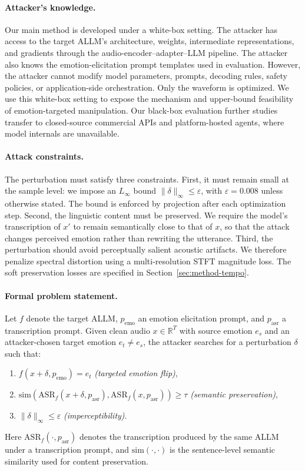 \paragraph{Attacker's knowledge.}
Our main method is developed under a white-box setting. The attacker has access to the target ALLM's architecture, weights, intermediate representations, and gradients through the audio-encoder--adapter--LLM pipeline. The attacker also knows the emotion-elicitation prompt templates used in evaluation. However, the attacker cannot modify model parameters, prompts, decoding rules, safety policies, or application-side orchestration. Only the waveform is optimized. We use this white-box setting to expose the mechanism and upper-bound feasibility of emotion-targeted manipulation. Our black-box evaluation further studies transfer to closed-source commercial APIs and platform-hosted agents, where model internals are unavailable.

\paragraph{Attack constraints.}
The perturbation must satisfy three constraints. First, it must remain small at the sample level: we impose an $L_\infty$ bound $\|\delta\|_\infty\leq \varepsilon$, with $\varepsilon=0.008$ unless otherwise stated. The bound is enforced by projection after each optimization step. Second, the linguistic content must be preserved. We require the model's transcription of $x'$ to remain semantically close to that of $x$, so that the attack changes perceived emotion rather than rewriting the utterance. Third, the perturbation should avoid perceptually salient acoustic artifacts. We therefore penalize spectral distortion using a multi-resolution STFT magnitude loss. The soft preservation losses are specified in Section~\ref{sec:method-tempo}.

\paragraph{Formal problem statement.}
Let $f$ denote the target ALLM, $p_{\mathrm{emo}}$ an emotion elicitation prompt, and $p_{\mathrm{asr}}$ a transcription prompt. Given clean audio $x\in\mathbb{R}^{T}$ with source emotion $e_s$ and an attacker-chosen target emotion $e_t\neq e_s$, the attacker searches for a perturbation $\delta$ such that:
\begin{enumerate}
    \item[\textnormal{(i)}] $f(x+\delta, p_{\mathrm{emo}})=e_t$ \hfill \textit{(targeted emotion flip)},
    \item[\textnormal{(ii)}] $\mathrm{sim}\!\left(\mathrm{ASR}_{f}(x+\delta,p_{\mathrm{asr}}),\mathrm{ASR}_{f}(x,p_{\mathrm{asr}})\right)\geq \tau$ \hfill \textit{(semantic preservation)},
    \item[\textnormal{(iii)}] $\|\delta\|_{\infty}\leq \varepsilon$ \hfill \textit{(imperceptibility)}.
\end{enumerate}
Here $\mathrm{ASR}_{f}(\cdot,p_{\mathrm{asr}})$ denotes the transcription produced by the same ALLM under a transcription prompt, and $\mathrm{sim}(\cdot,\cdot)$ is the sentence-level semantic similarity used for content preservation.

